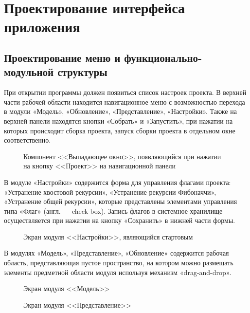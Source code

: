 \section{Проектирование интерфейса приложения}\label{sec:ch2/sec4}

\subsection{Проектирование меню и функционально-модульной структуры}\label{sec:ch2/sec4/subsec1}

При открытии программы должен появиться список настроек проекта. В верхней части рабочей области находится навигационное
меню с возможностью перехода в модули «Модель», «Обновление», «Представление», «Настройки». Также на верхней панели
находятся кнопки «Собрать» и «Запустить», при нажатии на которых происходит сборка проекта, запуск сборки проекта в отдельном окне соответственно.

\begin{figure}[ht]
	\centering
	\caption{Компонент <<Выпадающее окно>>, появляющийся при нажатии на кнопку <<Проект>> на навигационной панели}
	\label{fig:dropdown}
\end{figure}
\FloatBarrier

В модуле «Настройки» содержится форма для управления флагами проекта: «Устранение хвостовой рекурсии»,
«Устранение рекурсии Фибоначчи», «Устранение общей рекурсии», которые представлены элементами управления
типа «Флаг» (англ. –-- check-box). Запись флагов в системное хранилище осуществляется при нажатии
на кнопку «Сохранить» в нижней части формы.

\begin{figure}[ht]
	\centering
	\caption{Экран модуля <<Настройки>>, являющийся стартовым}
	\label{fig:settings_screen}
\end{figure}
\FloatBarrier

В модулях «Модель», «Представление», «Обновление» содержится рабочая область, представляющая пустое пространство,
на котором можно размещать элементы предметной области модуля используя механизм «drag-and-drop».

\begin{figure}[ht]
	\centering
	\caption{Экран модуля <<Модель>>}
	\label{fig:model_screen}
\end{figure}

\begin{figure}[ht]
	\centering
	\caption{Экран модуля <<Представление>>}
	\label{fig:view_screen}
\end{figure}

